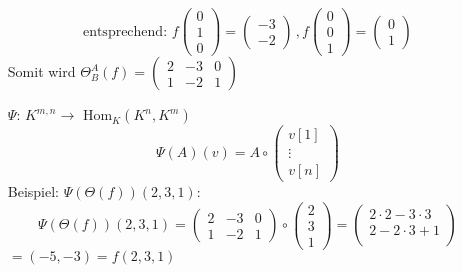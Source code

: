 \begin{itemize}
	\begin{equation*}
		\mbox{entsprechend: }f\begin{pmatrix}0\\1\\0\end{pmatrix} = \begin{pmatrix}-3\\-2\end{pmatrix}
		\, ,
		f\begin{pmatrix}0\\0\\1\end{pmatrix} = \begin{pmatrix}0\\1\end{pmatrix}
	\end{equation*}
	Somit wird $ \Theta_B^A (f)=\begin{pmatrix} 2 & -3 & 0\\ 1 & -2 & 1\end{pmatrix} $

	\item [$\Psi$:] $K^{m,n} \to $ Hom$_K(K^n, K^m)$
	\begin{equation*}
		\Psi (A)(v) = A \circ
		\begin{pmatrix}
			v[1]\\
			\vdots\\
			v[n]
		\end{pmatrix}
	\end{equation*}
	Beispiel: $\Psi(\Theta(f))(2, 3, 1)$:
	\begin{equation*}
		\Psi(\Theta(f))(2, 3, 1) =
		\begin{pmatrix}
			2 & -3 & 0\\
			1 & -2 & 1
		\end{pmatrix}
		\circ
		\begin{pmatrix}
			2\\3\\1
		\end{pmatrix}
		=
		\begin{pmatrix}
			2 \cdot 2 - 3 \cdot 3\\
			2 - 2 \cdot 3 + 1\\
		\end{pmatrix}
	\end{equation*}
	$ = (-5, -3) = f(2, 3, 1)$
\end{itemize}

